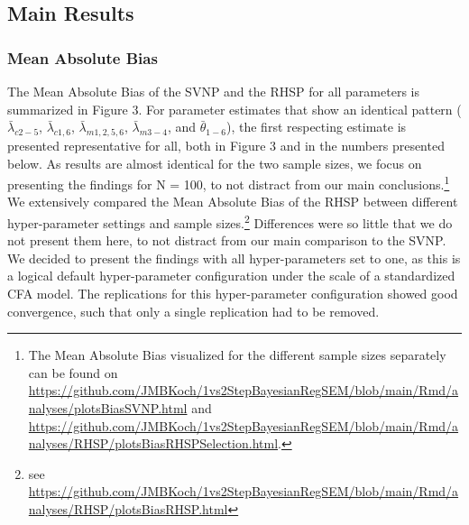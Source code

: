 \documentclass[
  man, donotrepeattitle,floatsintext]{apa6}
\begin{document}
\hypertarget{main-results}{%
\subsection{Main Results}\label{main-results}}

\hypertarget{mean-absolute-bias-1}{%
\subsubsection{Mean Absolute Bias}\label{mean-absolute-bias-1}}

The Mean Absolute Bias of the SVNP and the RHSP for all parameters is summarized in Figure 3. For parameter estimates that show an identical pattern (\(\bar{\lambda}_{c 2-5}\), \(\bar{\lambda}_{c 1, 6}\), \(\bar{\lambda}_{m 1, 2, 5, 6}\), \(\bar{\lambda}_{m 3-4}\), and \(\bar{\theta}_{1-6}\)), the first respecting estimate is presented representative for all, both in Figure 3 and in the numbers presented below. As results are almost identical for the two sample sizes, we focus on presenting the findings for N = 100, to not distract from our main conclusions.\footnote{The Mean Absolute Bias visualized for the different sample sizes separately can be found on \url{https://github.com/JMBKoch/1vs2StepBayesianRegSEM/blob/main/Rmd/analyses/plotsBiasSVNP.html} and \url{https://github.com/JMBKoch/1vs2StepBayesianRegSEM/blob/main/Rmd/analyses/RHSP/plotsBiasRHSPSelection.html}.} We extensively compared the Mean Absolute Bias of the RHSP between different hyper-parameter settings and sample sizes.\footnote{see \url{https://github.com/JMBKoch/1vs2StepBayesianRegSEM/blob/main/Rmd/analyses/RHSP/plotsBiasRHSP.html}} Differences were so little that we do not present them here, to not distract from our main comparison to the SVNP. We decided to present the findings with all hyper-parameters set to one, as this is a logical default hyper-parameter configuration under the scale of a standardized CFA model. The replications for this hyper-parameter configuration showed good convergence, such that only a single replication had to be removed.
\end{document}
